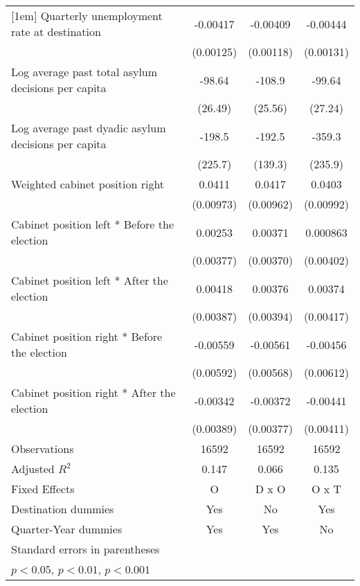\begin{table}[htbp]
\begin{tabular}{l*{3}{c}}
[1em]
Quarterly unemployment rate at destination&    -0.00417\sym{**} &    -0.00409\sym{**} &    -0.00444\sym{**} \\
                    &   (0.00125)         &   (0.00118)         &   (0.00131)         \\
[1em]
Log average past total asylum decisions per capita&      -98.64\sym{***}&      -108.9\sym{***}&      -99.64\sym{***}\\
                    &     (26.49)         &     (25.56)         &     (27.24)         \\
[1em]
Log average past dyadic asylum decisions per capita&      -198.5         &      -192.5         &      -359.3         \\
                    &     (225.7)         &     (139.3)         &     (235.9)         \\
[1em]
Weighted cabinet position right&      0.0411\sym{***}&      0.0417\sym{***}&      0.0403\sym{***}\\
                    &   (0.00973)         &   (0.00962)         &   (0.00992)         \\
[1em]
Cabinet position left * Before the election&     0.00253         &     0.00371         &    0.000863         \\
                    &   (0.00377)         &   (0.00370)         &   (0.00402)         \\
[1em]
Cabinet position left * After the election&     0.00418         &     0.00376         &     0.00374         \\
                    &   (0.00387)         &   (0.00394)         &   (0.00417)         \\
[1em]
Cabinet position right * Before the election&    -0.00559         &    -0.00561         &    -0.00456         \\
                    &   (0.00592)         &   (0.00568)         &   (0.00612)         \\
[1em]
Cabinet position right * After the election&    -0.00342         &    -0.00372         &    -0.00441         \\
                    &   (0.00389)         &   (0.00377)         &   (0.00411)         \\
\hline
Observations        &       16592         &       16592         &       16592         \\
Adjusted \(R^{2}\)  &       0.147         &       0.066         &       0.135         \\
Fixed Effects       &           O         &       D x O         &       O x T         \\
Destination dummies &         Yes         &          No         &         Yes         \\
Quarter-Year dummies&         Yes         &         Yes         &          No         \\
\hline\hline
\multicolumn{4}{l}{\footnotesize Standard errors in parentheses}\\
\multicolumn{4}{l}{\footnotesize \sym{*} \(p<0.05\), \sym{**} \(p<0.01\), \sym{***} \(p<0.001\)}\\
\end{tabular}
\end{table}

